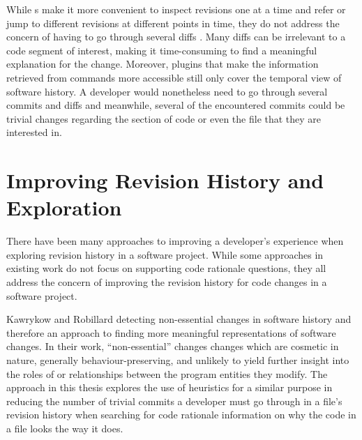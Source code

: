 While s make it more convenient to inspect revisions one at a time and refer 
or jump to different revisions at different points in time, they do not address the concern 
of having to go through several diffs
. 
Many diffs can be irrelevant to a code segment of interest, 
making it time-consuming to find a meaningful explanation for the change.
Moreover, plugins that make the information retrieved from  commands more 
accessible still only cover the temporal view of software history.
A developer would nonetheless need to go through several commits and diffs and meanwhile, 
several of the encountered commits could be trivial changes regarding the section of code 
or even the file that they are interested in.


\section{Improving Revision History and Exploration}

There have been many approaches to improving a developer's experience when exploring revision history in a software project. 
While some approaches in existing work do not focus on supporting code rationale questions, 
they all address the concern of improving the revision history for code changes in a software project.

Kawrykow and Robillard  detecting non-essential changes in software history and therefore an approach to finding 
more meaningful representations of software changes.
In their work, ``non-essential'' changes  changes which are cosmetic in nature, 
generally behaviour-preserving, and unlikely to yield further insight into the roles of or 
relationships between the program entities they modify. 
The approach in this thesis explores the use of heuristics for a similar purpose in reducing 
the number of trivial commits a developer must go through in a file's revision history when searching 
for code rationale information on why the code in a file looks the way it does.

